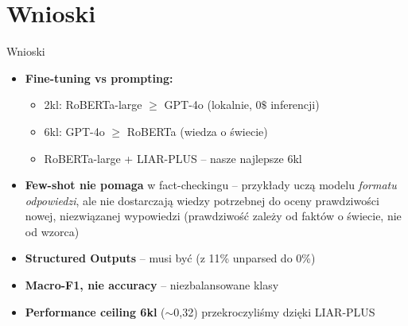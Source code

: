 \documentclass[10pt]{beamer}
\begin{document}
\section{Wnioski}

\begin{frame}{Wnioski}
  \begin{itemize}
    \item \textbf{Fine-tuning vs prompting:}
          \begin{itemize}
            \item 2kl: RoBERTa-large $\geq$ GPT-4o (lokalnie, 0$\$$ inferencji)
            \item 6kl: GPT-4o $\geq$ RoBERTa (wiedza o świecie)
            \item RoBERTa-large + LIAR-PLUS -- nasze najlepsze 6kl
          \end{itemize}
    \item \textbf{Few-shot nie pomaga} w fact-checkingu -- przykłady
          uczą modelu \emph{formatu odpowiedzi}, ale nie dostarczają wiedzy
          potrzebnej do oceny prawdziwości nowej, niezwiązanej wypowiedzi
          (prawdziwość zależy od faktów o świecie, nie od wzorca)
    \item \textbf{Structured Outputs} -- musi być (z 11\% unparsed do 0\%)
    \item \textbf{Macro-F1, nie accuracy} -- niezbalansowane klasy
    \item \textbf{Performance ceiling 6kl} ($\sim$0{,}32) przekroczyliśmy dzięki LIAR-PLUS
  \end{itemize}
\end{frame}
\end{document}
